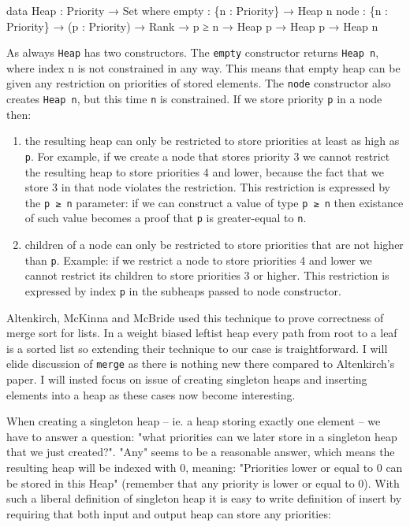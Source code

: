 \begin{code}
data Heap : Priority → Set where
  empty : \{n : Priority\} → Heap n
  node  : \{n : Priority\} → (p : Priority) → Rank → p ≥ n →
          Heap p → Heap p → Heap n
\end{code}
\noindent
As always \texttt{Heap} has two constructors. The \texttt{empty} constructor returns \texttt{Heap n}, where index n is not constrained in any way. This means that empty heap can be given any restriction on priorities of stored elements. The \texttt{node} constructor also creates \texttt{Heap n}, but this time \texttt{n} is constrained. If we store priority \texttt{p} in a node then:

\begin{enumerate}
 \item the resulting heap can only be restricted to store priorities at least as high as \texttt{p}. For example, if we create a node that stores priority 3 we cannot restrict the resulting heap to store priorities 4 and lower, because the fact that we store 3 in that node violates the restriction. This restriction is expressed by the \texttt{p ≥ n} parameter: if we can construct a value of type \texttt{p ≥ n} then existance of such value becomes a proof that \texttt{p} is greater-equal to \texttt{n}.
 \item children of a node can only be restricted to store priorities that are not higher than \texttt{p}. Example: if we restrict a node to store priorities 4 and lower we cannot restrict its children to store priorities 3 or higher. This restriction is expressed by index \texttt{p} in the subheaps passed to node constructor.
\end{enumerate}

Altenkirch, McKinna and McBride \cite{AltMcBMcK05} used this technique to prove correctness of merge sort for lists. In a weight biased leftist heap every path from root to a leaf is a sorted list so extending their technique to our case is traightforward. I will elide discussion of \texttt{merge} as there is nothing new there compared to Altenkirch's paper. I will insted focus on issue of creating singleton heaps and inserting elements into a heap as these cases now become interesting.

When creating a singleton heap -- ie. a heap storing exactly one element -- we have to answer a question: "what priorities can we later store in a singleton heap that we just created?". "Any" seems to be a reasonable answer, which means the resulting heap will be indexed with 0, meaning: "Priorities lower or equal to 0 can be stored in this Heap" (remember that any priority is lower or equal to 0). With such a liberal definition of singleton heap it is easy to write definition of insert by requiring that both input and output heap can store any priorities:

